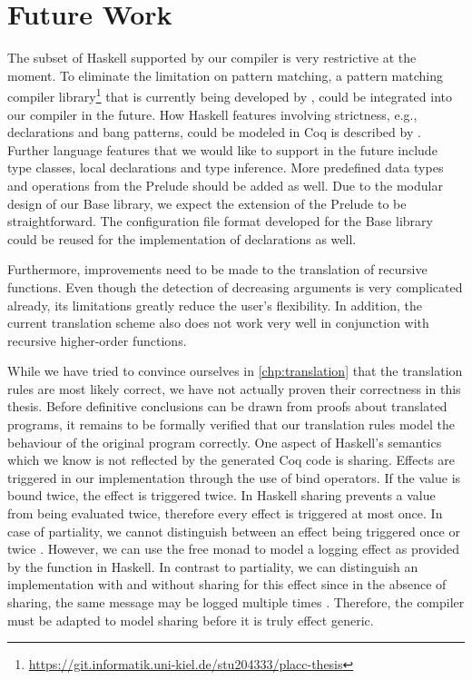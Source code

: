 \section{Future Work} \label{sec:conclusion:future-work}

The subset of Haskell supported by our compiler is very restrictive at the moment.
To eliminate the limitation on pattern matching, a pattern matching compiler library\footnote{\url{https://git.informatik.uni-kiel.de/stu204333/placc-thesis}} that is currently being developed by , could be integrated into our compiler in the future.
How Haskell features involving strictness, e.g.,  declarations and bang patterns, could be modeled in Coq is described by \citet[pp.~132-134]{Christiansen:2019}.
Further language features that we would like to support in the future include type classes, local declarations and type inference.
More predefined data types and operations from the Prelude should be added as well.
Due to the modular design of our Base library, we expect the extension of the Prelude to be straightforward.
The configuration file format developed for the Base library could be reused for the implementation of  declarations as well.

Furthermore, improvements need to be made to the translation of recursive functions.
Even though the detection of decreasing arguments is very complicated already, its limitations greatly reduce the user's flexibility.
In addition, the current translation scheme also does not work very well in conjunction with recursive higher-order functions.

While we have tried to convince ourselves in \autoref{chp:translation} that the translation rules are most likely correct, we have not actually proven their correctness in this thesis.
Before definitive conclusions can be drawn from proofs about translated programs, it remains to be formally verified that our translation rules model the behaviour of the original program correctly.
One aspect of Haskell's semantics which we know is not reflected by the generated Coq code is sharing.
Effects are triggered in our implementation through the use of bind operators.
If the value is bound twice, the effect is triggered twice.
In Haskell sharing prevents a value from being evaluated twice, therefore every effect is triggered at most once.
In case of partiality, we cannot distinguish between an effect being triggered once or twice \cite[p.~131]{Christiansen:2019}.
However, we can use the free monad to model a logging effect as provided by the function  in Haskell.
In contrast to partiality, we can distinguish an implementation with and without sharing for this effect since in the absence of sharing, the same message may be logged multiple times \cite[p.~131]{Christiansen:2019}.
Therefore, the compiler must be adapted to model sharing before it is truly effect generic.
